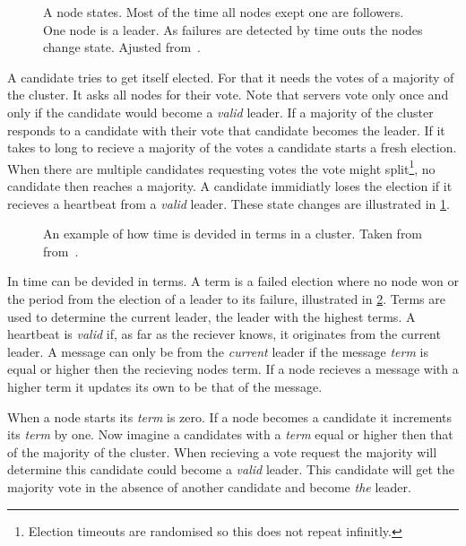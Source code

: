 \begin{figure}[htbp]
	\centering
	
	\caption{A \raft{} node states. Most of the time all nodes exept one are followers. One node is a leader. As failures are detected by time outs the nodes change state. Ajusted from~\cite{raft}.}
	\label{fig:raft_states}
\end{figure}
%
A candidate tries to get itself elected. For that it needs the votes of a majority of the cluster. It asks all nodes for their vote. Note that servers vote only once and only if the candidate would become a \emph{valid} leader. If a majority of the cluster responds to a candidate with their vote that candidate becomes the leader. If it takes to long to recieve a majority of the votes a candidate starts a fresh election. When there are multiple candidates requesting votes the vote might split\footnote{Election timeouts are randomised so this does not repeat infinitly.}, no candidate then reaches a majority. A candidate immidiatly loses the election if it recieves a heartbeat from a \emph{valid} leader. These state changes are illustrated in \cref{fig:raft_states}.

\begin{figure}[htbp]
	\centering
	
	\caption{An example of how time is devided in terms in a \raft{} cluster. Taken from from~\cite{raft}.}
	\label{fig:raft_terms}
\end{figure}

In \raft{} time can be devided in terms. A term is a failed election where no node won or the period from the election of a leader to its failure, illustrated in \cref{fig:raft_terms}. Terms are used to determine the current leader, the leader with the highest terms. A heartbeat is \emph{valid} if, as far as the reciever knows, it originates from the current leader. A message can only be from the \textit{current} leader if the message \textit{term} is equal or higher then the recieving nodes term. If a node recieves a message with a higher term it updates its own to be that of the message.

When a node starts its \textit{term} is zero. If a node becomes a candidate it increments its \textit{term} by one. Now imagine a candidates with a \textit{term} equal or higher then that of the majority of the cluster. When recieving a vote request the majority will determine this candidate could become a \emph{valid} leader. This candidate will get the majority vote in the absence of another candidate and become \textit{the} leader.

